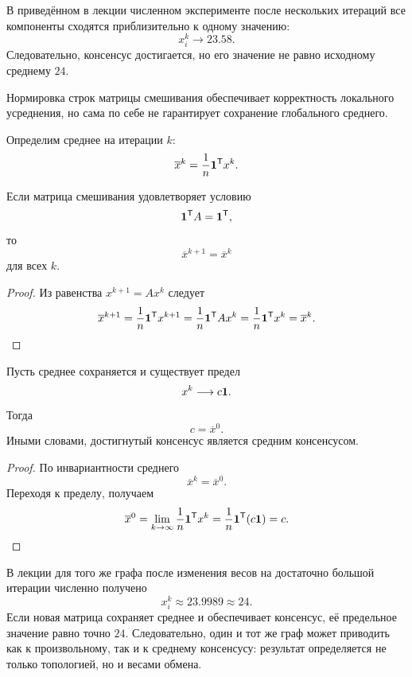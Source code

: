 В приведённом в лекции численном эксперименте после нескольких
итераций все компоненты сходятся приблизительно к одному значению:
\[
    x_i^k\longrightarrow 23.58.
\]
Следовательно, консенсус достигается, но его значение не равно
исходному среднему \(24\).

\begin{remark}
Нормировка строк матрицы смешивания обеспечивает корректность
локального усреднения, но сама по себе не гарантирует сохранение
глобального среднего.
\end{remark}



Определим среднее на итерации \(k\):
\[
    \overline{x}^k
    =
    \frac{1}{n}\mathbf{1}^{\mathsf{T}} x^k.
\]

\begin{lemma}
Если матрица смешивания удовлетворяет условию
\[
    \mathbf{1}^{\mathsf{T}} A=\mathbf{1}^{\mathsf{T}},
\]
то
\[
    \overline{x}^{k+1}=\overline{x}^k
\]
для всех \(k\).
\end{lemma}

\begin{proof}
Из равенства \(x^{k+1}=Ax^k\) следует
\[
    \overline{x}^{k+1}
    =
    \frac{1}{n}\mathbf{1}^{\mathsf{T}} x^{k+1}
    =
    \frac{1}{n}\mathbf{1}^{\mathsf{T}} Ax^k
    =
    \frac{1}{n}\mathbf{1}^{\mathsf{T}} x^k
    =
    \overline{x}^k.
\]
\end{proof}

\begin{theorem}
Пусть среднее сохраняется и существует предел
\[
    x^k\longrightarrow c\mathbf{1}.
\]
Тогда
\[
    c=\overline{x}^0.
\]
Иными словами, достигнутый консенсус является средним консенсусом.
\end{theorem}

\begin{proof}
По инвариантности среднего
\[
    \overline{x}^k=\overline{x}^0.
\]
Переходя к пределу, получаем
\[
    \overline{x}^0
    =
    \lim_{k\to\infty}\frac{1}{n}\mathbf{1}^{\mathsf{T}} x^k
    =
    \frac{1}{n}\mathbf{1}^{\mathsf{T}}(c\mathbf{1})
    =
    c.
\]
\end{proof}

В лекции для того же графа после изменения весов на достаточно
большой итерации численно получено
\[
    x_i^k\approx23.9989\approx24.
\]
Если новая матрица сохраняет среднее и обеспечивает консенсус, её
предельное значение равно точно \(24\). Следовательно, один и тот же
граф может приводить как к произвольному, так и к среднему консенсусу:
результат определяется не только топологией, но и весами обмена.

